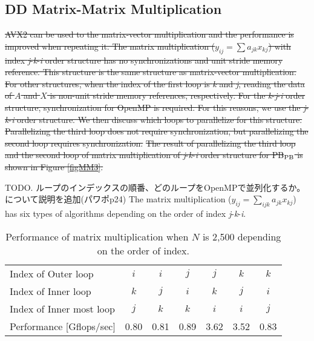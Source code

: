 \documentclass{IOS-Book-Article}
\begin{document}
\subsection{DD Matrix-Matrix Multiplication {\color{blue}{ノータッチ}}}
\sout{AVX2 can be used to the matrix-vector multiplication and the performance is improved when repeating it. The matrix multiplication ($y_{ij}=\sum a_{jk}x_{kj}$) with index {\it j}-{\it k}-{\it i} order structure has no synchronizations and unit stride memory reference. This structure is the same structure as matrix-vector multiplication. For other structures, when the index of the first loop is {\it k} and {\it j}, reading the data of $A$ and $X$ is non-unit stride memory references, respectively. For the {\it k}-{\it j}-{\it i} order structure, synchronization for OpenMP is required. For this reasons, we use the {\it j}-{\it k}-{\it i} order structure. We then discuss which loops to parallelize for this structure. Parallelizing the third loop does not require synchronization, but parallelizing the second loop requires synchronization.}
\sout{The result of parallelizing the third loop and the second loop of matrix multiplication of {\it j}-{\it k}-{\it i} order structure for PB$_{\rm{PB}}$ is shown in Figure \ref{figMM3}.}

TODO. ループのインデックスの順番、どのループをOpenMPで並列化するか。について説明を追加(パワポp24)
The matrix multiplication ($y_{ij}=\sum_{ijk} a_{jk}x_{kj}$) has six types of algorithms depending on the order of index {\it j}-{\it k}-{\it i}.
\begin{table}[htbp]
  \centering
  \caption{Performance of matrix multiplication when $N$ is 2,500 depending on the order of index.}
  \label{mmindx}
  \small
  \begin{tabular}{l|cccccc}
    \hline
  Index of Outer loop          & $i$    & $i$    & $j$    & $j$    & $k$    & $k$    \\
  Index of Inner loop          & $k$    & $j$    & $i$    & $k$    & $j$    & $i$    \\
  Index of Inner most loop     & $j$    & $k$    & $k$    & $i$    & $i$    & $j$    \\
  Performance {[}Gflops/sec{]} &  0.80  &  0.81  &  0.89  &  3.62  &  3.52  & 0.83
  \\ \hline
  \end{tabular}
\end{table}
\end{document}
